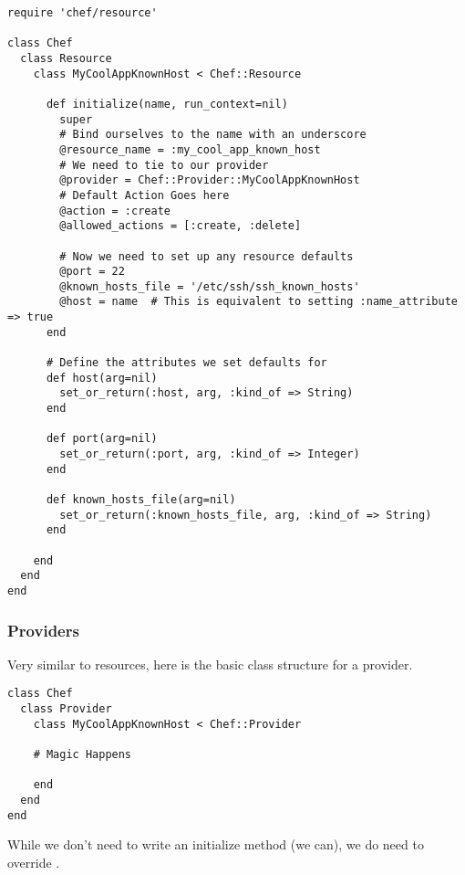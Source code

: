 \begin{lstlisting}[label=lst:cookbook-hwrp3]
require 'chef/resource'

class Chef
  class Resource
    class MyCoolAppKnownHost < Chef::Resource

      def initialize(name, run_context=nil)
        super
        # Bind ourselves to the name with an underscore
        @resource_name = :my_cool_app_known_host
        # We need to tie to our provider
        @provider = Chef::Provider::MyCoolAppKnownHost
        # Default Action Goes here
        @action = :create
        @allowed_actions = [:create, :delete]

        # Now we need to set up any resource defaults
        @port = 22
        @known_hosts_file = '/etc/ssh/ssh_known_hosts'
        @host = name  # This is equivalent to setting :name_attribute => true
      end

      # Define the attributes we set defaults for
      def host(arg=nil)
        set_or_return(:host, arg, :kind_of => String)
      end

      def port(arg=nil)
        set_or_return(:port, arg, :kind_of => Integer)
      end

      def known_hosts_file(arg=nil)
        set_or_return(:known_hosts_file, arg, :kind_of => String)
      end

    end
  end
end
\end{lstlisting}

\subsubsection{Providers}

Very similar to resources, here is the basic class structure for a provider.

\begin{lstlisting}[label=lst:cookbook-hwrp4]
class Chef
  class Provider
    class MyCoolAppKnownHost < Chef::Provider

    # Magic Happens

    end
  end
end
\end{lstlisting}

While we don’t need to write an initialize method (we can), we do need to override .

